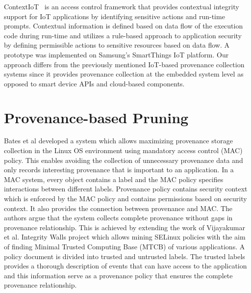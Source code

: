 ContextIoT~\cite{jia2017contexiot} is an access control framework that provides contextual integrity support for IoT applications by identifying sensitive actions and run-time prompts. Contextual information is defined based on data flow of the execution code during run-time and utilizes a rule-based approach to application security by defining permissible actions to sensitive resources based on data flow. A prototype was implemented on Samsung's SmartThings IoT platform.  Our approach differs from the previously mentioned IoT-based provenance collection systems since it provides provenance collection at the embedded system level as opposed to smart device APIs and cloud-based components.



\section{Provenance-based Pruning}

Bates et al \cite{Bates:2015:TOY:2814579.2814586} developed a system which allows maximizing provenance storage collection in the Linux OS environment using mandatory access control (MAC) policy. This enables avoiding the collection of unnecessary provenance data and only records interesting provenance that is important to an application. In a MAC system, every object contains a label and the MAC policy specifies interactions between different labels. Provenance policy contains security context which is enforced by the MAC policy and contains permissions based on security context. It also provides the connection between provenance and MAC. The authors argue that the system collects complete provenance without gaps in provenance relationship. This is achieved by extending the work of Vijayakumar et al. \cite{asiaccs12-vijayakumar} Integrity Walls project which allows mining SELinux policies with the aim of finding Minimal Trusted Computing Base (MTCB) of various applications. A policy document is divided into trusted and untrusted labels. The trusted labels provides a thorough description of events that can have access to the application and this information serve as a provenance policy that ensures the complete provenance relationship.

